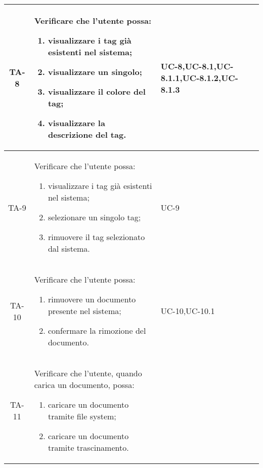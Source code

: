 \begin{xltabular}{\textwidth}{| c | X | X | c |}
    \hline
    TA-8 & Verificare che l’utente possa:
    \begin{enumerate}
        \item visualizzare i tag già esistenti nel sistema;
        \item visualizzare un singolo;
        \item visualizzare il colore del tag;
        \item visualizzare la descrizione del tag.
    \end{enumerate}& UC-8,\newline UC-8.1,\newline UC-8.1.1,\newline UC-8.1.2,\newline UC-8.1.3 & \textcolor{xmarkcolor}{} \\
    \hline
     TA-9 & Verificare che l’utente possa:
    \begin{enumerate}
        \item visualizzare i tag già esistenti nel sistema;
        \item selezionare un singolo tag;
        \item rimuovere il tag selezionato dal sistema.
        
    \end{enumerate}& UC-9 & \textcolor{xmarkcolor}{} \\
    \hline
     TA-10 & Verificare che l’utente possa:
    \begin{enumerate}
        \item rimuovere un documento presente nel sistema;
        \item confermare la rimozione del documento.
        
    \end{enumerate}& UC-10,\newline UC-10.1 & \textcolor{xmarkcolor}{} \\
    \hline
    TA-11 & Verificare che l’utente, quando carica un documento, possa:
    \begin{enumerate}
        \item caricare un documento tramite file system;
        \item caricare un documento tramite trascinamento.
        

\end{enumerate}
\end{xltabular}
